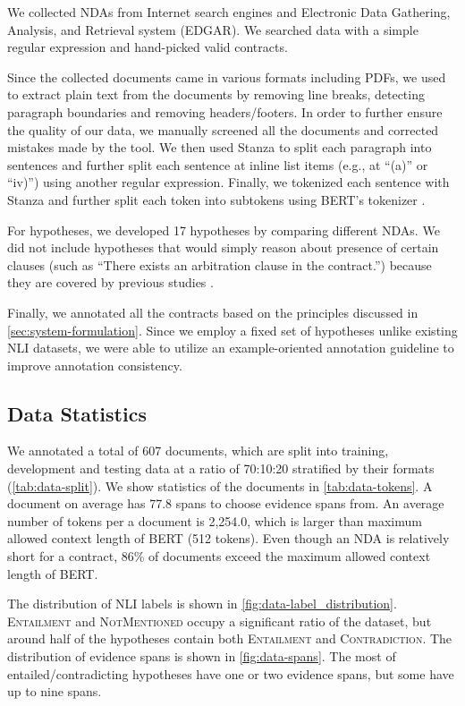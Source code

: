 We collected NDAs from Internet search engines and Electronic Data Gathering, Analysis, and Retrieval system (EDGAR).
We searched data with a simple regular expression and hand-picked valid contracts.

Since the collected documents came in various formats including PDFs, we used \cite{koreeda_capturing_2021} to extract plain text from the documents by removing line breaks, detecting paragraph boundaries and removing headers/footers.
In order to further ensure the quality of our data, we manually screened all the documents and corrected mistakes made by the tool.
We then used Stanza \cite{qi-etal-2020-stanza} to split each paragraph into sentences and further split each sentence at inline list items (e.g., at ``(a)'' or ``iv)'') using another regular expression.
Finally, we tokenized each sentence with Stanza and further split each token into subtokens using BERT's tokenizer \cite{devlin_bert_2019,wu_googles_2016}.

For hypotheses, we developed 17 hypotheses by comparing different NDAs.
We did not include hypotheses that would simply reason about presence of certain clauses (such as ``There exists an arbitration clause in the contract.'') because they are covered by previous studies \cite{leivaditi_benchmark_2020,hendrycks_cuad_2021}.

Finally, we annotated all the contracts based on the principles discussed in \cref{sec:system-formulation}.
Since we employ a fixed set of hypotheses unlike existing NLI datasets, we were able to utilize an example-oriented annotation guideline to improve annotation consistency.

\subsection{Data Statistics}\label{sec:dataset-statistics}

We annotated a total of 607 documents, which are split into training, development and testing data at a ratio of 70:10:20 stratified by their formats (\cref{tab:data-split}).
We show statistics of the documents in \cref{tab:data-tokens}.
A document on average has 77.8 spans to choose evidence spans from.
An average number of tokens per a document is 2,254.0, which is larger than maximum allowed context length of BERT (512 tokens).
Even though an NDA is relatively short for a contract, 86\% of documents exceed the maximum allowed context length of BERT.

The distribution of NLI labels is shown in \cref{fig:data-label_distribution}.
\textsc{Entailment} and \textsc{NotMentioned} occupy a significant ratio of the dataset, but around half of the hypotheses contain both \textsc{Entailment} and \textsc{Contradiction}.
The distribution of evidence spans is shown in \cref{fig:data-spans}.
The most of entailed/contradicting hypotheses have one or two evidence spans, but some have up to nine spans.

